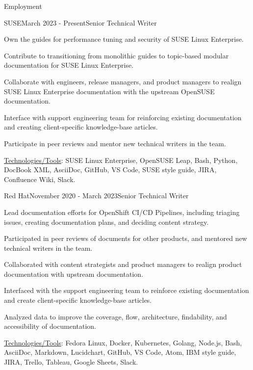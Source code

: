 \documentclass{resume} %
\begin{document}
\begin{rSection}{Employment}

\begin{rSubsection}{SUSE}{March 2023 - Present}{Senior Technical Writer}{}
\item Own the guides for performance tuning and security of SUSE Linux Enterprise.
\item Contribute to transitioning from monolithic guides to topic-based modular documentation for SUSE Linux Enterprise.
\item Collaborate with engineers, release managers, and product managers to realign SUSE Linux Enterprise documentation with the upstream OpenSUSE documentation.
\item Interface with support engineering team for reinforcing existing documentation and creating client-specific knowledge-base articles.
\item Participate in peer reviews and mentor new technical writers in the team. 
\item \underline{Technologies/Tools}: SUSE Linux Enterprise, OpenSUSE Leap, Bash, Python, DocBook XML, AsciiDoc, GitHub, VS Code, SUSE style guide, JIRA, Confluence Wiki, Slack. 
\end{rSubsection}

\begin{rSubsection}{Red Hat}{November 2020 - March 2023}{Senior Technical Writer}{}
\item Lead documentation efforts for OpenShift CI/CD Pipelines, including triaging issues, creating documentation plans, and deciding content strategy.
\item Participated in peer reviews of documents for other products, and mentored new technical writers in the team. 
\item Collaborated with content strategists and product managers to realign product documentation with upstream documentation.
\item Interfaced with the support engineering team to reinforce existing documentation and create client-specific knowledge-base articles.
\item Analyzed data to improve the coverage, flow, architecture, findability, and accessibility of documentation. 
\item \underline{Technologies/Tools}: Fedora Linux, Docker, Kubernetes, Golang, Node.js, Bash, AsciiDoc, Markdown, Lucidchart, GitHub, VS Code, Atom, IBM style guide, JIRA, Trello, Tableau, Google Sheets, Slack. 
\end{rSubsection}


\end{rSection}
\end{document}
